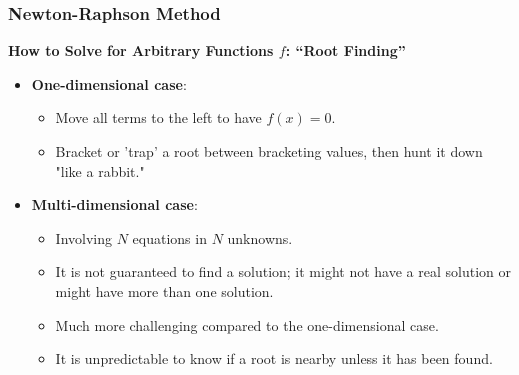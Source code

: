 \begin{frame}[fragile]
    \frametitle{Newton-Raphson Method}

    \textbf{How to Solve for Arbitrary Functions \( f \): “Root Finding”}

    \begin{itemize}
        \item \textbf{One-dimensional case}:
            \begin{itemize}
                \item Move all terms to the left to have \( f(x) = 0 \).
                \item Bracket or 'trap' a root between bracketing values, then hunt it down "like a rabbit."
            \end{itemize}
        
        \item \textbf{Multi-dimensional case}:
            \begin{itemize}
                \item Involving \( N \) equations in \( N \) unknowns.
                \item It is not guaranteed to find a solution; it might not have a real solution or might have more than one solution.
                \item Much more challenging compared to the one-dimensional case.
                \item It is unpredictable to know if a root is nearby unless it has been found.
            \end{itemize}
    \end{itemize}
\end{frame}

